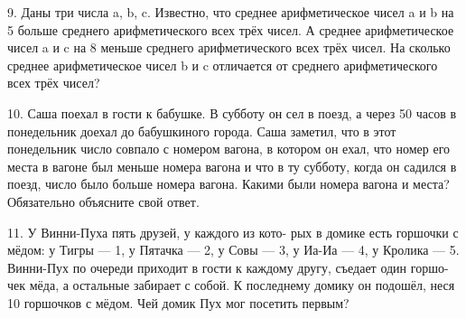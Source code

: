 \newpage

9. Даны три числа a, b, c. Известно, что среднее арифметическое чисел a и b на 5 больше среднего арифметического всех трёх чисел. А среднее арифметическое чисел a и c на 8 меньше среднего арифметического всех трёх чисел. На сколько среднее арифметическое чисел b и c отличается от среднего арифметического всех трёх чисел?

10. Саша поехал в гости к бабушке. В субботу он сел в поезд, а через 50 часов в понедельник доехал до бабушкиного города. Саша заметил, что в этот понедельник число совпало с номером вагона, в котором он ехал, что номер его места в вагоне был меньше номера вагона и что в ту субботу, когда он садился в поезд, число было больше номера вагона. Какими были номера вагона и места? Обязательно объясните свой ответ.

11. У Винни-Пуха пять друзей, у каждого из кото- рых в домике есть горшочки с мёдом: у Тигры — 1, у Пятачка — 2, у Совы — 3, у Иа-Иа — 4, у Кролика — 5. Винни-Пух по очереди приходит в гости к каждому другу, съедает один горшо- чек мёда, а остальные забирает с собой. К последнему домику он подошёл, неся 10 горшочков с мёдом. Чей домик Пух мог посетить первым?